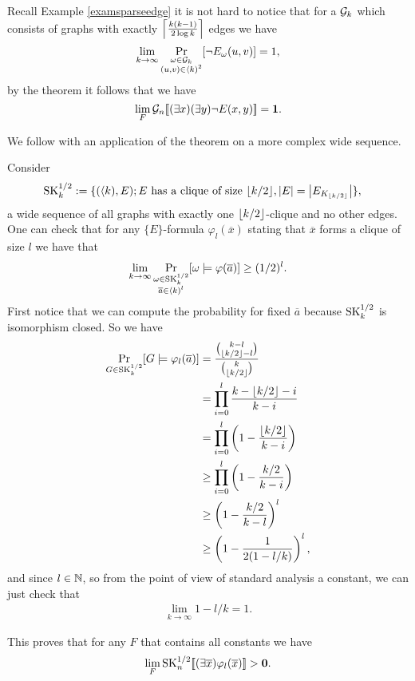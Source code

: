 \begin{exam}
Recall Example \ref{examsparseedge} it is not hard to notice that for a $\mathcal{G}_k$ which consists of graphs with exactly $\left \lceil {\frac{k(k-1)}{2\log k}} \right \rceil$ edges we have
\[\lim_{k\to\infty}\Pr_{\substack{\omega\in \mathcal{G}_k\\ (u,v) \in \langle k)^2}}[\lnot E_{\omega}(u,v)]=1,\]
by the theorem it follows that we have
\[\lim_{F}\mathcal{G}_n[\![(\exists x)(\exists y)\lnot E(x,y)]\!]=\textbf{1}.\]
\end{exam}

We follow with an application of the theorem on a more complex wide sequence.

\begin{exam}\label{examskhalf}
Consider
\begin{align*}
\text{SK}_k^{1/2}&:=\{(\langle k),E);\text{$E$ has a clique of size $\left \lfloor {k/2} \right \rfloor$}, \left|{E}\right|=\left|{E_{K_{\left \lfloor {k/2} \right \rfloor}}}\right|\},
\end{align*}
a wide sequence of all graphs with exactly one $\left \lfloor {k/2} \right \rfloor$-clique and no other edges. One can check that for any $\{E\}$-formula $\varphi_l(\overline x)$ stating that $\overline x$ forms a clique of size $l$ we have that 
\[\lim_{k\to\infty} \Pr_{\substack{\omega\in\text{SK}_k^{1/2}\\\overline a \in \langle k)^l}}[\omega\models \varphi(\overline a)]\geq(1/2)^l.\]
First notice that we can compute the probability for fixed $\overline a$ because $\text{SK}_k^{1/2}$ is isomorphism closed. So we have
\begin{align}
\Pr_{G\in\text{SK}_k^{1/2}}[G\models \varphi_l(\overline a)]&=\frac{\binom{k-l}{\left \lfloor {k/2} \right \rfloor-l}}{\binom{k}{\left \lfloor {k/2} \right \rfloor}}\\
&=\prod_{i=0}^l\frac{k-\left \lfloor {k/2} \right \rfloor-i}{k-i}\\
&=\prod_{i=0}^l\left(1-\frac{\left \lfloor {k/2} \right \rfloor}{k-i}\right)\\
&\geq\prod_{i=0}^l\left(1-\frac{k/2}{k-i}\right)\\
&\geq\left(1-\frac{k/2}{k-l}\right)^l\\
&\geq\left(1-\frac{1}{2(1-l/k)}\right)^l,
\end{align}
and since $l\in \mathbb{N}$, so from the point of view of standard analysis a constant, we can just check that
\begin{align}
\lim_{k\to\infty}1-l/k=1.
\end{align}

This proves that for any $F$ that contains all constants we have
\[\lim_{F}\text{SK}_{n}^{1/2}[\![(\exists \overline x)\varphi_l(\overline x)]\!]>\textbf{0}.\]
\end{exam}

